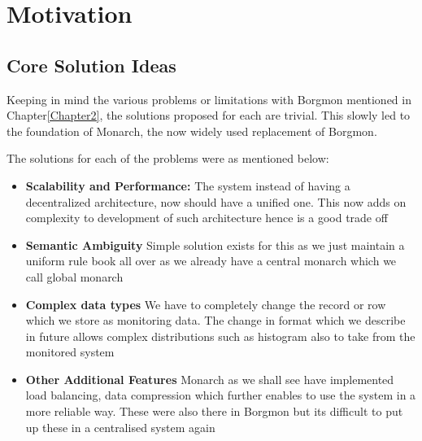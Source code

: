 


\section{Motivation}

\subsection{Core Solution Ideas}

Keeping in mind the various problems or limitations with Borgmon mentioned in Chapter\ref{Chapter2}, the solutions proposed for each are trivial. This slowly led to the foundation of Monarch, the now widely used replacement of Borgmon.

The solutions for each of the problems were as mentioned below:

\begin{itemize}
    \item \textbf{Scalability and Performance:} The system instead of having a decentralized architecture, now should have a unified one. This now adds on complexity to development of such architecture hence is a good trade off
    
    \item \textbf{Semantic Ambiguity} Simple solution exists for this as we just maintain a uniform rule book all over as we already have a central monarch which we call global monarch
    
    \item \textbf{Complex data types} We have to completely change the record or row which we store as monitoring data. The change in format which we describe in future allows complex distributions such as histogram also to take from the monitored system
    
    \item \textbf{Other Additional Features} Monarch as we shall see have implemented load balancing, data compression which further enables to use the system in a more reliable way. These were also there in Borgmon but its difficult to put up these in a centralised system again
\end{itemize}




